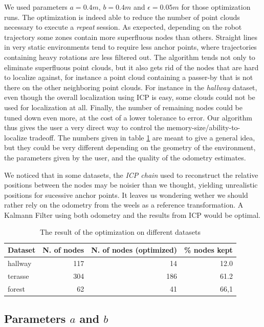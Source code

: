 \documentclass[letterpaper,10 pt,conference]{ieeeconf}
\begin{document}
We used parameters $a=0.4 m$, $b=0.4 m$ and $\epsilon=0.05 m$ for those optimization runs. The
optimization is indeed able to reduce the number of point clouds necessary to execute a
\textit{repeat} session. As exepected, depending on the robot trajectory some zones contain more
superfluous nodes than others. Straight lines in very static environments tend to require less
anchor points, where trajectories containing heavy rotations are less filtered out. The algorithm
tends not only to eliminate superfluous point clouds, but it also gets rid of the nodes that are
hard to localize against, for instance a point cloud containing a passer-by that is not there on the
other neighboring point clouds. For instance in the \textit{hallway} dataset, even though the
overall localization using ICP is easy, some clouds could not be used for localization at all.
Finally, the number of remaining nodes could be tuned down even more, at the cost of a lower
tolerance to error. Our algorithm thus gives the user a very direct way to control the
memory-size/ability-to-localize tradeoff. The numbers given in table
\ref{tabopti} are meant to give a general idea, but they could be very different depending on the
geometry of the environment, the parameters given by the user, and the quality of the odometry
estimates.

We noticed that in some datasets, the \textit{ICP chain} used to reconstruct the relative positions
between the nodes may be noisier than we thought, yielding unrealistic positions for sucessive
anchor points. It leaves us wondering wether we should rather rely on the odometry from the weels as
a reference transformation. A Kalmann Filter using both odometry and the results from ICP would be
optimal.

\begin{table}[h]
\centering
\begin{tabular}{|l|r|r|r|}
  \hline
Dataset & N. of nodes & N. of nodes (optimized) & \% nodes kept \\
\hline
  hallway & 117 & 14 & 12.0 \\
\hline
terasse & 304 & 186 & 61.2 \\
  \hline
forest & 62 & 41 & 66,1 \\
  \hline
\end{tabular}
\caption{The result of the optimization on different datasets}
\label{tabopti}
\end{table}


\subsection{Parameters $a$ and $b$}
\end{document}
